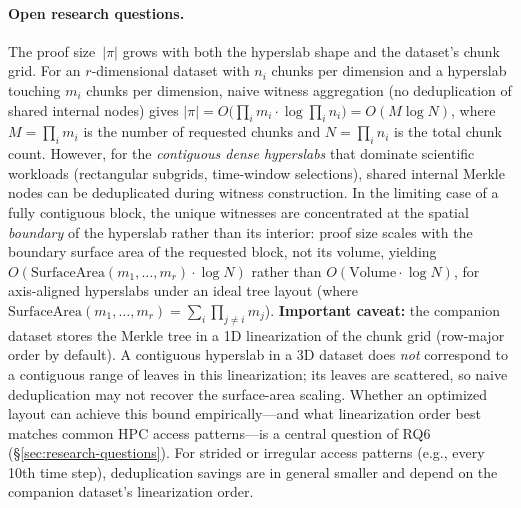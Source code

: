 \documentclass[11pt]{article}
\begin{document}
\paragraph{Open research questions.}
The proof size~$|\pi|$ grows with both the hyperslab shape and the dataset's
chunk grid. For an $r$-dimensional dataset with $n_i$ chunks per dimension and
a hyperslab touching $m_i$ chunks per dimension, naive witness aggregation
(no deduplication of shared internal nodes) gives
$|\pi| = O\bigl(\prod_i m_i \cdot \log \prod_i n_i\bigr) = O(M \log N)$,
where $M = \prod_i m_i$ is the number of requested chunks and
$N = \prod_i n_i$ is the total chunk count. However, for the
\emph{contiguous dense hyperslabs} that dominate scientific workloads
(rectangular subgrids, time-window selections), shared internal Merkle
nodes can be deduplicated during witness construction.  In the limiting
case of a fully contiguous block, the unique witnesses are concentrated
at the spatial \emph{boundary} of the hyperslab rather than its interior:
proof size scales with the boundary surface area of the requested block,
not its volume, yielding $O\!\left(\mathrm{SurfaceArea}(m_1,\dots,m_r)\cdot\log N\right)$
rather than $O\!\left(\mathrm{Volume}\cdot\log N\right)$,
for axis-aligned hyperslabs under an ideal tree layout (where
$\mathrm{SurfaceArea}(m_1,\dots,m_r)=\sum_i \prod_{j\neq i} m_j$).
\textbf{Important caveat:} the companion dataset stores the Merkle tree in
a 1D linearization of the chunk grid (row-major order by default). A
contiguous hyperslab in a 3D dataset does \emph{not} correspond to a
contiguous range of leaves in this linearization; its leaves are scattered,
so naive deduplication may not recover the surface-area scaling.
Whether an optimized layout can achieve this bound empirically---and what
linearization order best matches common HPC access patterns---is a central
question of RQ6 (\S\ref{sec:research-questions}). For
strided or irregular access patterns (e.g., every 10th time step),
deduplication savings are in general smaller and depend on the companion
dataset's linearization order.
\end{document}
